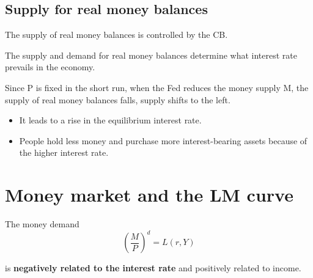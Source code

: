 \documentclass[10pt]{article}
\begin{document}
\subsection{Supply for real money balances}
The supply of real money balances is controlled by the CB.

The supply and demand for real money balances determine what interest rate prevails
in the economy.


\begin{figure}[H]
\end{figure}

Since P is fixed in the short run, when the Fed reduces the money supply M, the supply
of real money balances falls, supply shifts to the left. 
\begin{itemize}
\item It leads to a rise in the equilibrium interest rate.
\item People hold less money and purchase more interest-bearing assets because of the
		higher interest rate.
\end{itemize}



\section{Money market and the LM curve}
The money demand
\begin{equation*}
\left( \frac{M}{P} \right) ^{d} = L(r, Y)
\end{equation*}

is {\textbf {negatively related to the interest rate}} and positively related to income.
\end{document}
